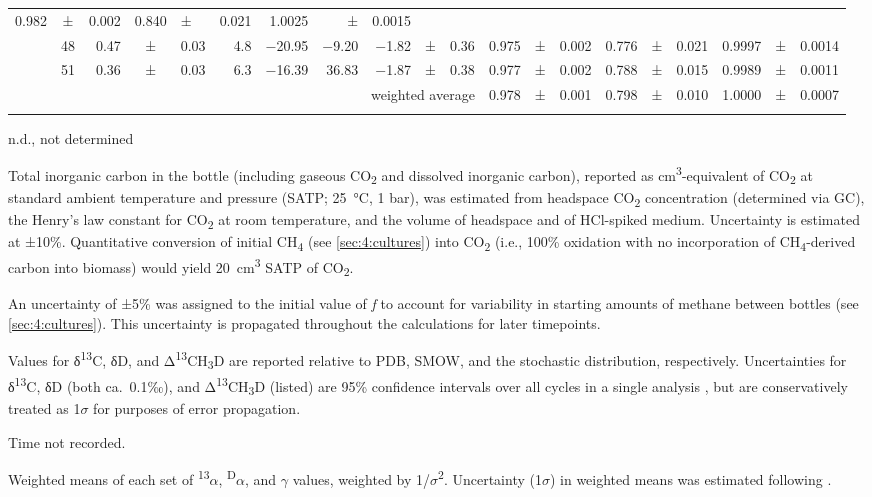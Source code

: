 \begin{sidewaystable}
\begin{threeparttable}
\begin{tabular}{lc r@{\;}c@{\;}l r r r r@{\;}c@{\;}l r@{\;}c@{\;}l r@{\;}c@{\;}l r@{\;}c@{\;}l}
			0.982 & ± & 0.002 & 0.840 & ± & 0.021 & 1.0025 & ± &
			0.0015\tabularnewline
			& 48 & 0.47 & ± & 0.03 & 4.8 & $-$20.95 & $-$9.20 & $-$1.82 & ± & 0.36 & 0.975
			& ± & 0.002 & 0.776 & ± & 0.021 & 0.9997 & ± & 0.0014\tabularnewline
			& 51 & 0.36 & ± & 0.03 & 6.3 & $-$16.39 & 36.83 & $-$1.87 & ± & 0.38 & 0.977
			& ± & 0.002 & 0.788 & ± & 0.015 & 0.9989 & ± & 0.0011\tabularnewline \cmidrule{12-20} 
			& & & & & & & \multicolumn{4}{r}{weighted average\tnote{e}} & 0.978 & ± & 0.001 &
			0.798 & ± & 0.010 & 1.0000 & ± & 0.0007\tabularnewline
			& & & & & & & & & & & & & & & & & & &\tabularnewline
			\bottomrule
		\end{tabular}
		{\small n.d., not determined}
		\begin{tablenotes}
				\item[a] Total inorganic carbon in the bottle (including
				gaseous CO\textsubscript{2} and dissolved inorganic carbon), reported as
				cm\textsuperscript{3}-equivalent of CO\textsubscript{2} at standard
				ambient temperature and pressure (SATP; 25~°C, 1 bar), was estimated
				from headspace CO\textsubscript{2} concentration (determined via GC),
				the Henry's law constant for CO\textsubscript{2} at room temperature,
				and the volume of headspace and of HCl-spiked medium. Uncertainty is
				estimated at ±10\%. Quantitative conversion of initial
				CH\textsubscript{4} (see \autoref{sec:4:cultures}) into CO\textsubscript{2} (i.e., 100\%
				oxidation with no incorporation of CH\textsubscript{4}-derived carbon
				into biomass) would yield 20~cm\textsuperscript{3} SATP of
				CO\textsubscript{2}.
				
				\item[b] An uncertainty of ±5\% was assigned to the initial
				value of \emph{f} to account for variability in starting amounts of
				methane between bottles (see \autoref{sec:4:cultures}). This uncertainty is propagated
				throughout the calculations for later timepoints.
				
				\item[c] Values for δ\textsuperscript{13}C, δD, and
				Δ\textsuperscript{13}CH\textsubscript{3}D are reported relative to PDB,
				SMOW, and the stochastic distribution, respectively. Uncertainties for
				δ\textsuperscript{13}C, δD (both ca.\ 0.1‰), and
				Δ\textsuperscript{13}CH\textsubscript{3}D (listed) are 95\% confidence
				intervals over all cycles in a single analysis \parencite[e.g.,][]{Wang++_2015_S},
				but are conservatively treated as 1$\sigma$ for purposes of error propagation.
				
				\item[d] Time not recorded.
				
				\item[e] Weighted means of each set of \textsuperscript{13}$\alpha$,
				\textsuperscript{D}$\alpha$, and $\gamma$ values, weighted by 1/$\sigma$\textsuperscript{2}.
				Uncertainty (1$\sigma$) in weighted means was estimated following \textcite{Bevington+Robinson_3e}.
		\end{tablenotes}
	\end{threeparttable}
\end{sidewaystable}
